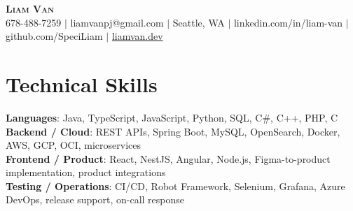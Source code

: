 \documentclass[letterpaper,11pt]{article}
\begin{document}

%
\begin{center}
    \textbf{\Huge \scshape Liam Van} \\ \vspace{1pt}
    \small 678-488-7259 $|$ \small {liamvanpj@gmail.com} $|$ Seattle, WA
 {{$|$ linkedin.com/in/liam-van} {$|$ github.com/SpeciLiam} {$|$ \href{https://liamvan.dev}{liamvan.dev}}}

\end{center}

\section{Technical Skills}
 \begin{itemize}[leftmargin=0.15in, label={}]
    \small{\item{
     \textbf{Languages}{: Java, TypeScript, JavaScript, Python, SQL, C\#, C++, PHP, C} \\
     \textbf{Backend / Cloud}{: REST APIs, Spring Boot, MySQL, OpenSearch, Docker, AWS, GCP, OCI, microservices} \\
     \textbf{Frontend / Product}{: React, NestJS, Angular, Node.js, Figma-to-product implementation, product integrations} \\
     \textbf{Testing / Operations}{: CI/CD, Robot Framework, Selenium, Grafana, Azure DevOps, release support, on-call response} \\
    }}
 \end{itemize}
%

\end{document}

